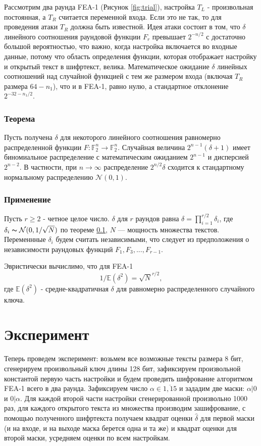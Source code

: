 \documentclass[utf8x, 14pt]{G7-32} %
\begin{document}
Рассмотрим два раунда FEA-1 (Рисунок \ref{fig:trial}), настройка $T_L$ - произвольная постоянная, а $T_R$ считается переменной входа. Если это не так, то для проведения атаки $T_R$ должна быть известной. Идея атаки состоит в том, что $\delta$  линейного соотношения раундовой функции $F_r$ превышает $ 2^{-n/2}$ с достаточно большой вероятностью, что важно, когда настройка включается во входные данные, потому что область определения функции, которая отображает настройку и открытый текст в шифртекст, велика. Математическое ожидание $\delta$ линейных соотношений над случайной функцией с тем же размером входа (включая $T_R$ размера $64-n_1$), что и в FEA-1, равно нулю, а стандартное отклонение $2^{-32-n_1/2}$. 

\subsection{Теорема}\label{theorem}

 Пусть получена $\delta$ для некоторого линейного соотношения равномерно распределенной функции $F: \mathbb{F}_2^n \to \mathbb{F}_2^n$. Случайная величина $2^{n-1}(\delta+1)$ имеет биномиальное распределение с математическим ожиданием $2^{n-1}$ и дисперсией $2^{n-2}$. В частности, при $n\to\infty$ распределение $2^{n/2}\delta$ сходится к стандартному нормальному распределению $\mathcal{N}(0,1)$.

\subsection{Применение}

Пусть $r\geq 2$ - четное целое число. $\delta$ для $r$ раундов равна $\delta=\prod_{i=1}^{r/2} \delta_i$, где $\delta_i \thicksim \mathcal{N}(0,1/\sqrt{N})$ по теореме \ref{theorem}, $N$ --- мощность множества текстов. Переменнные $\delta_i$ будем считать независимыми, что следует из предположения о независимости раундовых функций $F_1, F_3, ..., F_{r-1}$.

Эвристически вычислимо, что для FEA-1
\begin{equation}
\label{eqn:keyeq}
1/\mathbb{E}(\delta^2)=\sqrt{N}^{r/2},\end{equation} 
где $\mathbb{E}(\delta^2)$ - средне-квадратичная $\delta$ для равномерно распределенного случайного ключа.


\chapter{Эксперимент}
Теперь проведем эксперимент: возьмем все возможные тексты размера 8 бит, сгенерируем произвольный ключ длины 128 бит, зафиксируем произвольной константой первую часть настройки и будем проведить шифрование алгоритмом FEA-1 всего в два раунда. Зафиксируем число $\alpha \in \overline{1,15}$ и зададим две маски: $\alpha|0$ и $0|\alpha$. Для каждой второй части настройки сгенерированной произвольно 1000 раз, для каждого открытого текста из множества производим зашифрование, с помощью полученного шифртекста получаем квадрат оценки $\hat{\delta}$ для первой маски (и на входе, и на выходе маска берется одна и та же) и квадрат оценки для второй маски, усредняем оценки по всем настройкам. 
\end{document}
